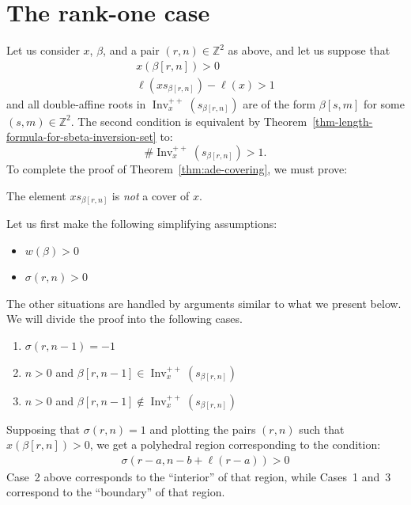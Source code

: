 \documentclass[ALCO,ThmDefs,Unicode]{cedram}
\DeclareMathOperator{\Inv}{Inv}
\newcommand{\ZZ}{\mathbb{Z}}
\newcommand{\Invplusplusx}{\Inv^{++}_x}
\begin{document}
\section{The rank-one case}

Let us consider $x$, $\beta$, and a pair $(r,n) \in \ZZ^2$ as above, and let us suppose that
\begin{align}\label{eq:104}
x(\beta[r,n]) > 0 \\
\ell(xs_{\beta[r,n]}) - \ell(x) > 1
\end{align}
and all double-affine roots in $\Invplusplusx(s_{\beta[r,n]})$ are of the form $\beta[s,m]$ for some $(s,m) \in \ZZ^2$. The second condition is equivalent by Theorem~\ref{thm-length-formula-for-sbeta-inversion-set} to:
\begin{equation}\label{eq:105}
\#\Invplusplusx(s_{\beta[r,n]}) > 1.
\end{equation}
To complete the proof of Theorem~\ref{thm:ade-covering}, we must prove:

\begin{prop}\label{prop:sl-two-cover-classification}
The element $xs_{\beta[r,n]}$ is \emph{not} a cover of $x$.
\end{prop}

Let us first make the following simplifying assumptions:
\begin{itemize}
\item $w(\beta) > 0$
\item $\sigma(r,n) > 0$
\end{itemize}
The other situations are handled by arguments similar to what we present below. We will divide the proof into the following cases.
\begin{enumerate}[label=Case \arabic*:]
\item $\sigma(r,n-1) = -1$
\item $n > 0$ and $ \beta[r,n-1] \in \Invplusplusx(s_{\beta[r,n]})$
\item $n > 0$ and $ \beta[r,n-1] \notin \Invplusplusx(s_{\beta[r,n]})$
\end{enumerate}

\begin{rema}
Supposing that $\sigma(r,n) =1$ and plotting the pairs $(r,n)$ such that $x(\beta[r,n]) > 0$, we get a polyhedral region corresponding to the condition:
\begin{align}\label{eq:48}
\sigma(r-a,n-b+\ell(r-a)) > 0
\end{align}
Case~2 above corresponds to the ``interior'' of that region, while Cases~1 and~3 correspond to the ``boundary'' of that region.
\end{rema}
\end{document}
